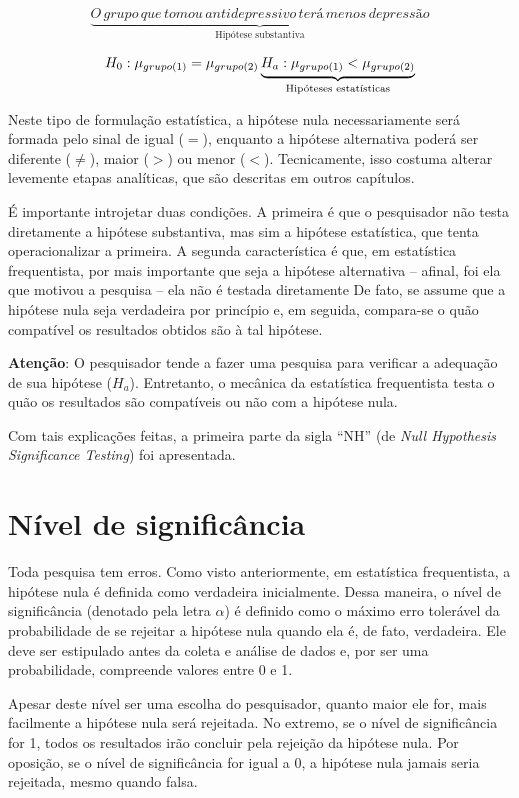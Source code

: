 \documentclass[
]{book}
\begin{document}
\[\underbrace{O \,grupo \,que \,tomou \,antidepressivo \,terá \,menos \,depressão}_\text{Hipótese  substantiva}\]

\[H_0: \mu_{grupo (1)} = \mu_{grupo (2)} \\ \underbrace{H_a: \mu_{grupo (1)} < \mu_{grupo (2)}}_\text{Hipóteses estatísticas}\]

Neste tipo de formulação estatística, a hipótese nula necessariamente será formada pelo sinal de igual (\(=\)), enquanto a hipótese alternativa poderá ser diferente (\(\neq\)), maior (\(>\)) ou menor (\(<\)). Tecnicamente, isso costuma alterar levemente etapas analíticas, que são descritas em outros capítulos.

É importante introjetar duas condições. A primeira é que o pesquisador não testa diretamente a hipótese substantiva, mas sim a hipótese estatística, que tenta operacionalizar a primeira. A segunda característica é que, em estatística frequentista, por mais importante que seja a hipótese alternativa -- afinal, foi ela que motivou a pesquisa -- ela não é testada diretamente De fato, se assume que a hipótese nula seja verdadeira por princípio e, em seguida, compara-se o quão compatível os resultados obtidos são à tal hipótese.

\textbf{Atenção}: O pesquisador tende a fazer uma pesquisa para verificar a adequação de sua hipótese (\(H_a\)). Entretanto, o mecânica da estatística frequentista testa o quão os resultados são compatíveis ou não com a hipótese nula.

Com tais explicações feitas, a primeira parte da sigla ``NH'' (de \emph{Null Hypothesis Significance Testing}) foi apresentada.

\hypertarget{nuxedvel-de-significuxe2ncia}{%
\section{Nível de significância}\label{nuxedvel-de-significuxe2ncia}}

Toda pesquisa tem erros. Como visto anteriormente, em estatística frequentista, a hipótese nula é definida como verdadeira inicialmente. Dessa maneira, o nível de significância (denotado pela letra \(\alpha\)) é definido como o máximo erro tolerável \citep{Greenland2019} da probabilidade de se rejeitar a hipótese nula quando ela é, de fato, verdadeira. Ele deve ser estipulado antes da coleta e análise de dados e, por ser uma probabilidade, compreende valores entre 0 e 1.

Apesar deste nível ser uma escolha do pesquisador, quanto maior ele for, mais facilmente a hipótese nula será rejeitada. No extremo, se o nível de significância for 1, todos os resultados irão concluir pela rejeição da hipótese nula. Por oposição, se o nível de significância for igual a 0, a hipótese nula jamais seria rejeitada, mesmo quando falsa.
\end{document}
